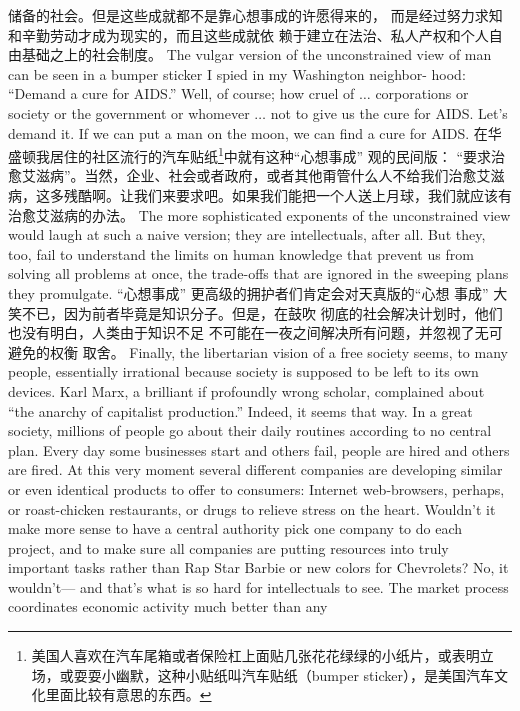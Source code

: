 \begin{paracol}{2}
储备的社会。但是这些成就都不是靠心想事成的许愿得来的，
而是经过努力求知和辛勤劳动才成为现实的，而且这些成就依
赖于建立在法治、私人产权和个人自由基础之上的社会制度。
\switchcolumn*
The vulgar version of the unconstrained view of man can be
seen in a bumper sticker I spied in my Washington neighbor-
hood: ``Demand a cure for AIDS.'' Well, of course; how cruel of
$\ldots$ corporations or society or the government or whomever $\ldots$
not to give us the cure for AIDS. Let's demand it. If we can put
a man on the moon, we can find a cure for AIDS.
\switchcolumn
在华盛顿我居住的社区流行的汽车贴纸\footnote{美国人喜欢在汽车尾箱或者保险杠上面贴几张花花绿绿的小纸片，或表明立场，或耍耍小幽默，这种小贴纸叫汽车贴纸（bumper sticker），是美国汽车文化里面比较有意思的东西。}中就有这种“心想事成” 观的民间版： “要求治愈艾滋病”。当然，企业、社会或者政府，或者其他甭管什么人不给我们治愈艾滋病，这多残酷啊。让我们来要求吧。如果我们能把一个人送上月球，我们就应该有治愈艾滋病的办法。
\switchcolumn*
The more sophisticated exponents of the unconstrained view
would laugh at such a naive version; they are intellectuals, after
all. But they, too, fail to understand the limits on human
knowledge that prevent us from solving all problems at once,
the trade-offs that are ignored in the sweeping plans they promulgate.
\switchcolumn
“心想事成” 更高级的拥护者们肯定会对天真版的“心想
事成” 大笑不已，因为前者毕竟是知识分子。但是，在鼓吹
彻底的社会解决计划时，他们也没有明白，人类由于知识不足
不可能在一夜之间解决所有问题，并忽视了无可避免的权衡
取舍。
\switchcolumn*
Finally, the libertarian vision of a free society seems, to many
people, essentially irrational because society is supposed to be
left to its own devices. Karl Marx, a brilliant if profoundly
wrong scholar, complained about ``the anarchy of capitalist production.'' Indeed, it seems that way. In a great society, millions
of people go about their daily routines according to no central
plan. Every day some businesses start and others fail, people are
hired and others are fired. At this very moment several different
companies are developing similar or even identical products to
offer to consumers: Internet web-browsers, perhaps, or roast-chicken restaurants, or drugs to relieve stress on the heart.
Wouldn't it make more sense to have a central authority pick
one company to do each project, and to make sure all companies are putting resources into truly important tasks rather than
Rap Star Barbie or new colors for Chevrolets? No, it wouldn't---
and that's what is so hard for intellectuals to see. The market
process coordinates economic activity much better than any

\end{paracol}
